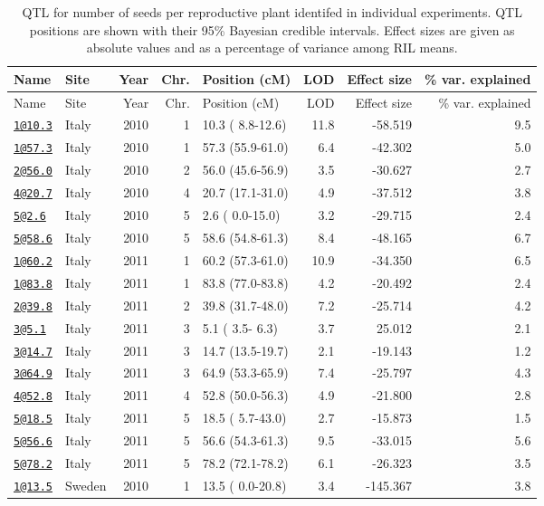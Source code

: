 \documentclass[]{article}
\begin{document}
\newpage

\begin{longtable}[]{@{}llrrlrrr@{}}
\caption{QTL for number of seeds per reproductive plant identifed in
individual experiments. QTL positions are shown with their 95\% Bayesian
credible intervals. Effect sizes are given as absolute values and as a
percentage of variance among RIL means.}\tabularnewline
\toprule
Name & Site & Year & Chr. & Position (cM) & LOD & Effect size & \% var.
explained\tabularnewline
\midrule
\endfirsthead
\toprule
Name & Site & Year & Chr. & Position (cM) & LOD & Effect size & \% var.
explained\tabularnewline
\midrule
\endhead
\href{mailto:1@10.3}{\nolinkurl{1@10.3}} & Italy & 2010 & 1 & 10.3 (
8.8-12.6) & 11.8 & -58.519 & 9.5\tabularnewline
\href{mailto:1@57.3}{\nolinkurl{1@57.3}} & Italy & 2010 & 1 & 57.3
(55.9-61.0) & 6.4 & -42.302 & 5.0\tabularnewline
\href{mailto:2@56.0}{\nolinkurl{2@56.0}} & Italy & 2010 & 2 & 56.0
(45.6-56.9) & 3.5 & -30.627 & 2.7\tabularnewline
\href{mailto:4@20.7}{\nolinkurl{4@20.7}} & Italy & 2010 & 4 & 20.7
(17.1-31.0) & 4.9 & -37.512 & 3.8\tabularnewline
\href{mailto:5@2.6}{\nolinkurl{5@2.6}} & Italy & 2010 & 5 & 2.6 (
0.0-15.0) & 3.2 & -29.715 & 2.4\tabularnewline
\href{mailto:5@58.6}{\nolinkurl{5@58.6}} & Italy & 2010 & 5 & 58.6
(54.8-61.3) & 8.4 & -48.165 & 6.7\tabularnewline
\href{mailto:1@60.2}{\nolinkurl{1@60.2}} & Italy & 2011 & 1 & 60.2
(57.3-61.0) & 10.9 & -34.350 & 6.5\tabularnewline
\href{mailto:1@83.8}{\nolinkurl{1@83.8}} & Italy & 2011 & 1 & 83.8
(77.0-83.8) & 4.2 & -20.492 & 2.4\tabularnewline
\href{mailto:2@39.8}{\nolinkurl{2@39.8}} & Italy & 2011 & 2 & 39.8
(31.7-48.0) & 7.2 & -25.714 & 4.2\tabularnewline
\href{mailto:3@5.1}{\nolinkurl{3@5.1}} & Italy & 2011 & 3 & 5.1 ( 3.5-
6.3) & 3.7 & 25.012 & 2.1\tabularnewline
\href{mailto:3@14.7}{\nolinkurl{3@14.7}} & Italy & 2011 & 3 & 14.7
(13.5-19.7) & 2.1 & -19.143 & 1.2\tabularnewline
\href{mailto:3@64.9}{\nolinkurl{3@64.9}} & Italy & 2011 & 3 & 64.9
(53.3-65.9) & 7.4 & -25.797 & 4.3\tabularnewline
\href{mailto:4@52.8}{\nolinkurl{4@52.8}} & Italy & 2011 & 4 & 52.8
(50.0-56.3) & 4.9 & -21.800 & 2.8\tabularnewline
\href{mailto:5@18.5}{\nolinkurl{5@18.5}} & Italy & 2011 & 5 & 18.5 (
5.7-43.0) & 2.7 & -15.873 & 1.5\tabularnewline
\href{mailto:5@56.6}{\nolinkurl{5@56.6}} & Italy & 2011 & 5 & 56.6
(54.3-61.3) & 9.5 & -33.015 & 5.6\tabularnewline
\href{mailto:5@78.2}{\nolinkurl{5@78.2}} & Italy & 2011 & 5 & 78.2
(72.1-78.2) & 6.1 & -26.323 & 3.5\tabularnewline
\href{mailto:1@13.5}{\nolinkurl{1@13.5}} & Sweden & 2010 & 1 & 13.5 (
0.0-20.8) & 3.4 & -145.367 & 3.8\tabularnewline

\end{longtable}
\end{document}

